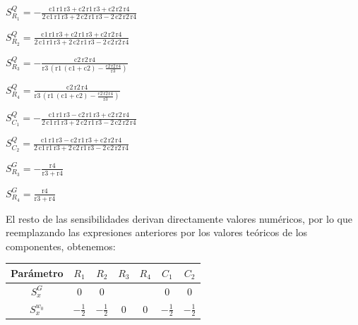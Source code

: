 \documentclass[../tc_tpfinal_main.tex]{subfiles}
\begin{document}
$S^{Q}_{R_1} = -\frac{\mathrm{c1}\, \mathrm{r1}\, \mathrm{r3} + \mathrm{c2}\, \mathrm{r1}\, \mathrm{r3} + \mathrm{c2}\, \mathrm{r2}\, \mathrm{r4}}{2\, \mathrm{c1}\, \mathrm{r1}\, \mathrm{r3} + 2\, \mathrm{c2}\, \mathrm{r1}\, \mathrm{r3} - 2\, \mathrm{c2}\, \mathrm{r2}\, \mathrm{r4}}
$ \par
$S^{Q}_{R_2} = \frac{\mathrm{c1}\, \mathrm{r1}\, \mathrm{r3} + \mathrm{c2}\, \mathrm{r1}\, \mathrm{r3} + \mathrm{c2}\, \mathrm{r2}\, \mathrm{r4}}{2\, \mathrm{c1}\, \mathrm{r1}\, \mathrm{r3} + 2\, \mathrm{c2}\, \mathrm{r1}\, \mathrm{r3} - 2\, \mathrm{c2}\, \mathrm{r2}\, \mathrm{r4}}
$\par
$S^{Q}_{R_3} = -\frac{\mathrm{c2}\, \mathrm{r2}\, \mathrm{r4}}{\mathrm{r3}\, \left(\mathrm{r1}\, \left(\mathrm{c1} + \mathrm{c2}\right) - \frac{\mathrm{c2}\, \mathrm{r2}\, \mathrm{r4}}{\mathrm{r3}}\right)}
$\par
$S^{Q}_{R_4} = \frac{\mathrm{c2}\, \mathrm{r2}\, \mathrm{r4}}{\mathrm{r3}\, \left(\mathrm{r1}\, \left(\mathrm{c1} + \mathrm{c2}\right) - \frac{\mathrm{c2}\, \mathrm{r2}\, \mathrm{r4}}{\mathrm{r3}}\right)}
$\par
$S^{Q}_{C_1} = -\frac{\mathrm{c1}\, \mathrm{r1}\, \mathrm{r3} - \mathrm{c2}\, \mathrm{r1}\, \mathrm{r3} + \mathrm{c2}\, \mathrm{r2}\, \mathrm{r4}}{2\, \mathrm{c1}\, \mathrm{r1}\, \mathrm{r3} + 2\, \mathrm{c2}\, \mathrm{r1}\, \mathrm{r3} - 2\, \mathrm{c2}\, \mathrm{r2}\, \mathrm{r4}}
$\par
$S^{Q}_{C_2} = \frac{\mathrm{c1}\, \mathrm{r1}\, \mathrm{r3} - \mathrm{c2}\, \mathrm{r1}\, \mathrm{r3} + \mathrm{c2}\, \mathrm{r2}\, \mathrm{r4}}{2\, \mathrm{c1}\, \mathrm{r1}\, \mathrm{r3} + 2\, \mathrm{c2}\, \mathrm{r1}\, \mathrm{r3} - 2\, \mathrm{c2}\, \mathrm{r2}\, \mathrm{r4}}
$ \par

$S^G_{R_3} = -\frac{\mathrm{r4}}{\mathrm{r3} + \mathrm{r4}}$\par
$S^G_{R_4} = \frac{\mathrm{r4}}{\mathrm{r3} + \mathrm{r4}}$\par

El resto de las sensibilidades derivan directamente valores numéricos, por lo que reemplazando las expresiones anteriores por los valores teóricos de los componentes, obtenemos:\par

			 	\begin{table}[H] %
				\centering
 				\begin{tabular}{||c c c c c c c||} 
 					\hline
				  Parámetro& $R_1$ & $R_2$ & $R_3$ & $R_4$&$C_1$&$C_2$\\ [0.5ex] 
 					\hline\hline
					 $S^G_x$& 0& 0&&&0&0\\
					 $S^{w_0}_x$& $- \frac{1}{2}$ &$- \frac{1}{2}$& 0& 0&$- \frac{1}{2}$&$- \frac{1}{2}$\\
					\hline
				\end{tabular}
			\end{table}
\end{document}
